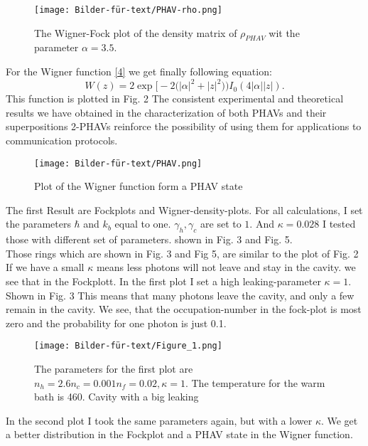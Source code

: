 \documentclass[12pt,a4paper]{article}
\begin{document}
\begin{figure}[hbtp]
\centering
\texttt{[image: Bilder-für-text/PHAV-rho.png]}\label{21}
\caption{The Wigner-Fock plot of the density matrix of $\rho_{PHAV}$ wit the parameter $\alpha=3.5$.}
\end{figure}


For the Wigner function \eqref{4} we get finally following equation:
\begin{equation}
W(z)=2  \exp\bigl[-2\bigl(|\alpha|^2+|z|^2\bigr)\bigr) I_0 (4|\alpha| |z|).
\end{equation}
This function is plotted in Fig. 2
The consistent experimental and theoretical results we have obtained in the characterization of both PHAVs and their superpositions 2-PHAVs reinforce the
possibility of using them for applications to communication protocols. \cite{Allevi2013}
\begin{figure}[h!]
\centering
\texttt{[image: Bilder-für-text/PHAV.png]}
\caption{Plot of the Wigner function form a PHAV state}
\end{figure}

The first Result are Fockplots and Wigner-density-plots.
For all calculations, I set the parameters  $\hbar$ and $k_b$ equal to one. $\gamma_h, \gamma_c $ are set to $ 1$. And $\kappa=0.028$
I tested those with different set of parameters. 
shown in Fig. 3 and Fig. 5.\\
Those rings which are shown in Fig. 3 and Fig 5, are similar to the plot of Fig. 2
If we have a small $\kappa$ means less photons will not leave and stay in the cavity. we see that in the Fockplott.
In the first plot I set a high leaking-parameter $\kappa=1$. Shown in Fig. 3
This means that many photons leave the cavity, and only a few remain in the cavity. 
We see, that the occupation-number in the fock-plot is most zero and the probability for one photon is just 0.1.

\begin{figure}[hbtp]
\centering
\texttt{[image: Bilder-für-text/Figure\_1.png]}
\caption{The parameters for the first plot are$ n_h=2.6 n_c=0.001 n_f=0.02,\kappa=1$. The temperature for the warm bath is 460. Cavity with a big leaking}
\end{figure}\newpage

In the second plot I took the same parameters again, but with a lower $\kappa$. We get a better distribution in the Fockplot and a PHAV state in the Wigner function. 
\end{document}
